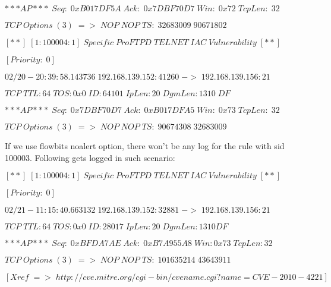 \documentclass[11pt, pdftex]{article}
\begin{document}
\begin{enumerate}
$***AP***\; Seq:\; 0xB017DF5A\;  Ack:\; 0x7DBF70D7\;  Win:\; 0x72\;  TcpLen:\; 32$

$TCP\; Options\; (3)\; =>\; NOP\; NOP\; TS:\; 32683009\; 90671802$



$[**]\; [1:100004:1]\; Specific\; ProFTPD\; TELNET\; IAC\; Vulnerability\; [**]$

$[Priority:\; 0]$

$02/20-20:39:58.143736\; 192.168.139.152:41260\; ->\; 192.168.139.156:21$

$TCP\; TTL:64\; TOS:0x0\; ID:64101\; IpLen:20\; DgmLen:1310\; DF$

$***AP***\; Seq:\; 0x7DBF70D7\;  Ack:\; 0xB017DFA5\;  Win:\; 0x73\;  TcpLen:\; 32$

$TCP\; Options\; (3)\; =>\; NOP\; NOP\; TS:\; 90674308\; 32683009$


If we use flowbits noalert option, there won't be any log for the rule with sid 100003. Following gets logged in such scenario:

$[**]\; [1:100004:1]\; Specific\; ProFTPD\; TELNET\; IAC\; Vulnerability\; [**]$

$[Priority:\; 0]$

$02/21-11:15:40.663132\; 192.168.139.152:32881\; ->\; 192.168.139.156:21$

$TCP\; TTL:64\; TOS:0x0\; ID:28017\; IpLen:20\; DgmLen:1310 DF$

$***AP***\; Seq:\; 0xBFDA7AE\;  Ack:\; 0xB7A955A8\;  Win: 0x73\;  TcpLen: 32$

$TCP\; Options\; (3)\; =>\; NOP\; NOP\; TS:\; 101635214\; 43643911$

$[Xref\; =>\; http://cve.mitre.org/cgi-bin/cvename.cgi?name=CVE-2010-4221]$


\end{enumerate}
\end{document}

